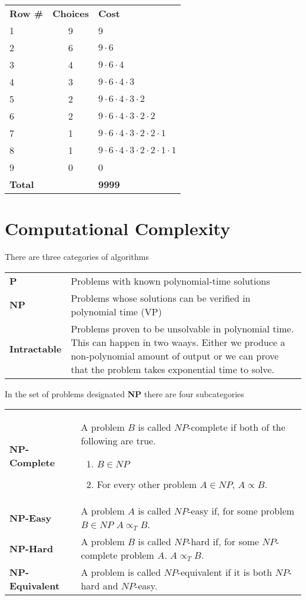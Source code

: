 \documentclass[aip, jmp, amsmath,amssymb, reprint]{revtex4-1}
\theoremstyle{definition}
\begin{document}
\begin{center}
\begin{tabular}{l | c | l}
	\textbf{Row \#} & \textbf{Choices} & \textbf{Cost} \\
	1 & 9 & 9 \\
	2 & 6 & $9 \cdot 6$ \\
	3 & 4 & $9 \cdot 6 \cdot 4$ \\
	4 & 3 & $9 \cdot 6 \cdot 4 \cdot 3$ \\
	5 & 2 & $9 \cdot 6 \cdot 4 \cdot 3 \cdot 2$ \\
	6 & 2 & $9 \cdot 6 \cdot 4 \cdot 3 \cdot 2 \cdot 2$ \\
	7 & 1 & $9 \cdot 6 \cdot 4 \cdot 3 \cdot 2 \cdot 2 \cdot 1$ \\
	8 & 1 & $9 \cdot 6 \cdot 4 \cdot 3 \cdot 2 \cdot 2 \cdot 1 \cdot 1$ \\
	9 & 0 & 0 \\
	\hline
	\textbf{Total} & & \textbf{9999}
\end{tabular}
\end{center}

\section{Computational Complexity}

There are three categories of algorithms
\begin{longtable}{p{2.2cm} p{6cm} }
    \textbf{P} & Problems with known polynomial-time solutions \\
    \textbf{NP} & Problems whose solutions can be verified in polynomial time (VP) \\
    \textbf{Intractable} & Problems proven to be unsolvable in polynomial time. This can happen in two waays. Either we produce a
                           non-polynomial amount of output or we can prove that the problem takes exponential time to solve. \\
\end{longtable}

In the set of problems designated \textbf{NP} there are four subcategories
\begin{longtable}{p{2.2cm} p{6cm} }
    \textbf{NP-Complete} & A problem $B$ is called $NP$-complete if both of the following are true. 
                            \begin{enumerate}
                                \item $B \in NP$ 
                                \item For every other problem $A \in NP$, $A \propto B$.
                            \end{enumerate} \\
    \textbf{NP-Easy} & A problem $A$ is called $NP$-easy if, for some problem $B \in NP$ $A \propto_T B$. \\
    \textbf{NP-Hard} & A problem $B$ is called $NP$-hard if, for some $NP$-complete problem $A$. $A \propto_T B$. \\
    \textbf{NP-Equivalent} & A problem is called $NP$-equivalent if it is both $NP$-hard and $NP$-easy. \\
\end{longtable}
\end{document}
